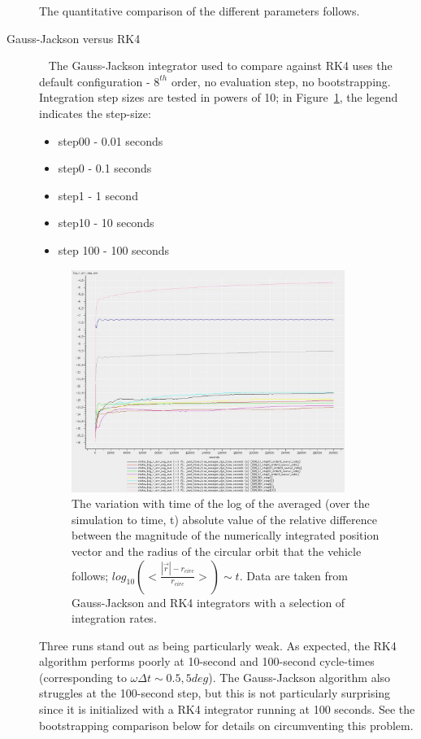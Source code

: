 \begin{description}
The quantitative comparison of the different parameters follows.

\item[Gauss-Jackson versus RK4]\ \newline
The Gauss-Jackson integrator used to compare against RK4 uses the default 
configuration - $8^{th}$ order, no evaluation step, no bootstrapping.  
Integration step sizes are tested in powers of 10; in 
Figure~\ref{fig:GJ_RK_logs}, the legend indicates the step-size:
\begin{itemize}
 \item step00 - 0.01 seconds
 \item step0 - 0.1 seconds
 \item step1 - 1 second
 \item step10 - 10 seconds
 \item step 100 - 100 seconds
\end{itemize}

\begin{figure}[!ht]
\centering
\includegraphics[width=3.5in]{figures/GJ_RK_logs.jpg}
\caption[Variation with Time of Orbital Position Error]{The variation with time of the log of the averaged (over the 
simulation to time, t) absolute value of the relative difference between the 
magnitude of the numerically integrated position vector and the radius of the 
circular orbit that the vehicle follows; $log_{10} (<\frac{|\vec{r}| - 
r_{circ}}{r_{circ}}>) \sim t$.   Data are taken from Gauss-Jackson and RK4 
integrators with a selection of integration rates.}
\label{fig:GJ_RK_logs}
\end{figure}

Three runs stand out as being particularly weak.  As expected, the RK4 
algorithm performs poorly at 10-second and 100-second cycle-times 
(corresponding to $\omega \Delta t \sim 0.5, 5 deg$).  The 
Gauss-Jackson algorithm also 
struggles at the 100-second step, but this is not particularly surprising 
since it 
is initialized with a RK4 integrator running at 100 seconds.  See the 
bootstrapping comparison below for details on circumventing this problem.


\end{description}
